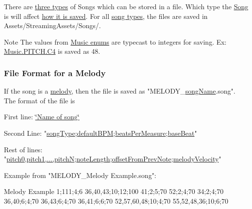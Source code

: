 There are \hyperlink{group___song_enums_gae681a1f001333e39fc1cb4fea97bfe1b}{three types} of Songs which can be stored in a file. Which type the \hyperlink{class_song}{Song} is will affect \hyperlink{group___song_pub_func_ga70b0f6021c3b0590c561a88e3d1e5c2f}{how it is saved}. For all \hyperlink{group___song_enums_gae681a1f001333e39fc1cb4fea97bfe1b}{song types}, the files are saved in Assets/\+Streaming\+Assets/\+Songs/. \begin{DoxyNote}{Note}
The values from \hyperlink{group___doc_music_DocMusicEnums}{Music enums} are typecast to integers for saving. Ex\+: \hyperlink{group___music_enums_gga508f69b199ea518f935486c990edac1dab713e6323a68d3ddabf4855826c50148}{Music.\+P\+I\+T\+C\+H.\+C4} is saved as 48.
\end{DoxyNote}
\hypertarget{group___song_group_DocSongFileFormatMelody}{}\subsubsection{File Format for a Melody}\label{group___song_group_DocSongFileFormatMelody}
If the song is a \hyperlink{group___song_group_DocSongMelody}{melody}, then the file is saved as "M\+E\+L\+O\+D\+Y\+\_\+\hyperlink{group___song_priv_var_ga6a5e6c1e4aa92939e2b5c1e3d9908df8}{song\+Name}.song". The format of the file is \begin{DoxyItemize}
\item First line\+: \hyperlink{group___song_priv_var_ga6a5e6c1e4aa92939e2b5c1e3d9908df8}{\char`\"{}\+Name of song\char`\"{}} \item Second Line\+: "\hyperlink{group___song_enums_gae681a1f001333e39fc1cb4fea97bfe1b}{song\+Type};\hyperlink{group___audio_DefBPM}{default\+B\+PM};\hyperlink{group___music_structs_acda79d249e7a1974a152832a881e9f0b}{beats\+Per\+Measure};\hyperlink{group___music_structs_aaf5b010a2541959c26f96630db042ee8}{base\+Beat}" \item Rest of lines\+: "\hyperlink{group___music_structs_aab23b49ea9d7961aef5091154ce45946}{pitch0,pitch1,...,pitchN};\hyperlink{group___music_structs_ac35cd02f5b3c00e3040b51e40e9e6c94}{note\+Length};\hyperlink{group___music_structs_ae281187907aed4c728c7981300dbebaf}{offset\+From\+Prev\+Note};\hyperlink{group___music_structs_a0c87d54ce8d28ea08fb4a526cb821c20}{melody\+Velocity}" \item Example from "M\+E\+L\+O\+D\+Y\+\_\+\+Melody Example.\+song"\+: \begin{DoxyVerb}Melody Example
1;111;4;6
36,40,43;10;12;100
41;2;5;70
52;2;4;70
34;2;4;70
36,40;6;4;70
36,43;6;4;70
36,41;6;6;70
52,57,60,48;10;4;70
55,52,48,36;10;6;70
\end{DoxyVerb}
\end{DoxyItemize}
